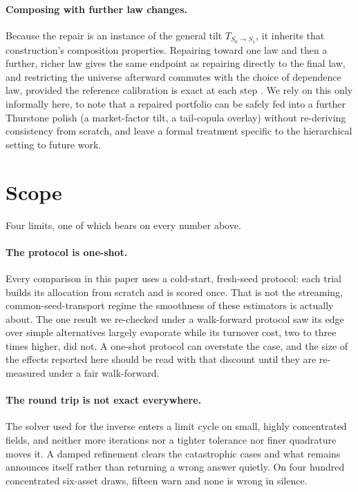 \documentclass[11pt]{article}
\begin{document}
\paragraph{Composing with further law changes.} Because the repair is an
instance of the general tilt $T_{S_0\to S_1}$, it inherits that
construction's composition properties. Repairing toward one law and then a
further, richer law gives the same endpoint as repairing directly to the
final law, and restricting the universe afterward commutes with the choice
of dependence law, provided the reference calibration is exact at each step
\parencite{cotton2026polish}. We rely on this only informally here, to note
that a repaired portfolio can be safely fed into a further Thurstone polish
(a market-factor tilt, a tail-copula overlay) without re-deriving
consistency from scratch, and leave a formal treatment specific to the
hierarchical setting to future work.

\section{Scope}\label{sec:scope}

Four limits, one of which bears on every number above.

\paragraph{The protocol is one-shot.} Every comparison in this paper uses a
cold-start, fresh-seed protocol: each trial builds its allocation from scratch
and is scored once. That is not the streaming, common-seed-transport regime
the smoothness of these estimators is actually about. The one result we
re-checked under a walk-forward protocol saw its edge over simple alternatives
largely evaporate while its turnover cost, two to three times higher, did not.
A one-shot protocol can overstate the case, and the size of the effects
reported here should be read with that discount until they are re-measured
under a fair walk-forward.

\paragraph{The round trip is not exact everywhere.} The solver used for the
inverse enters a limit cycle on small, highly concentrated fields, and neither
more iterations nor a tighter tolerance nor finer quadrature moves it. A damped
refinement clears the catastrophic cases and what remains announces itself
rather than returning a wrong answer quietly. On four hundred concentrated
six-asset draws, fifteen warn and none is wrong in silence.
\end{document}
